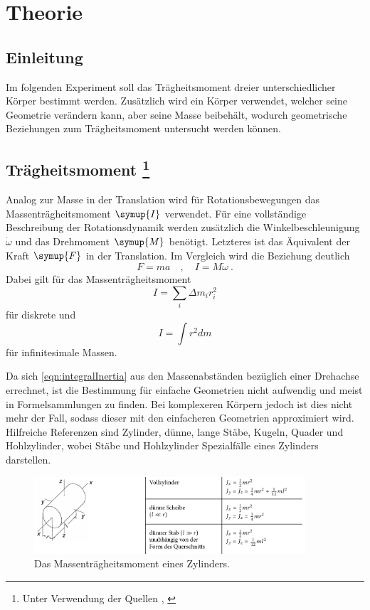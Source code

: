 \section{Theorie}
\label{sec:Theorie}
\subsection{Einleitung}
Im folgenden Experiment soll das Trägheitsmoment dreier unterschiedlicher Körper bestimmt werden.
Zusätzlich wird ein Körper verwendet, welcher seine Geometrie verändern kann, aber seine Masse beibehält,
wodurch geometrische Beziehungen zum Trägheitsmoment untersucht werden können.

\subsection{Trägheitsmoment \footnote{Unter Verwendung der Quellen \cite{taschenbuch}, \cite{Versuchsanleitung}}}
Analog zur Masse in der Translation wird für Rotationsbewegungen das Massenträgheitsmoment $\symup{I}$ verwendet.
Für eine vollständige Beschreibung der Rotationsdynamik werden zusätzlich die Winkelbeschleunigung $\dot{\omega}$
und das Drehmoment $\symup{M}$ benötigt. Letzteres ist das Äquivalent der Kraft $\symup{F}$ in der Translation.
Im Vergleich wird die Beziehung deutlich
\begin{equation}
    F = m a \quad ,\quad I = M\dot{\omega} \:.
\end{equation}
Dabei gilt für das Massenträgheitsmoment
\begin{equation*}
    I = \sum_i \Delta m_i r_i^2
\end{equation*}
für diskrete und
\begin{equation}
    \label{eqn:integralInertia}
    I = \int r^2 dm
\end{equation}
für infinitesimale Massen.

Da sich \eqref{eqn:integralInertia} aus den Massenabständen bezüglich einer Drehachse errechnet,
ist die Bestimmung für einfache Geometrien nicht aufwendig und meist in Formelsammlungen zu finden.
Bei komplexeren Körpern jedoch ist dies nicht mehr der Fall, sodass dieser mit den einfacheren Geometrien
approximiert wird.
Hilfreiche Referenzen sind Zylinder, dünne, lange Stäbe, Kugeln, Quader und Hohlzylinder, wobei Stäbe und Hohlzylinder
Spezialfälle eines Zylinders darstellen.
\begin{figure}
    \centering
    \includegraphics[width=0.9\textwidth]{plots/TrägheitZylinder.png}
    \caption{Das Massenträgheitsmoment eines Zylinders.\cite{taschenbuch}}
    \label{fig:traegZyl}
\end{figure}

